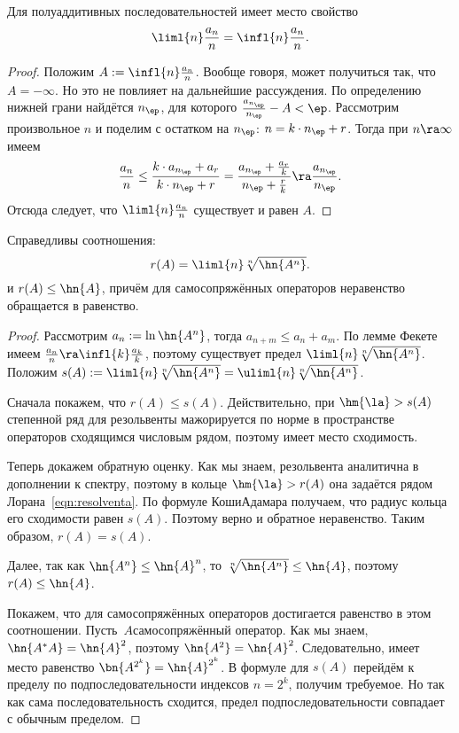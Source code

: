 \documentclass[a4paper]{article}
\begin{document}
\begin{lemma}[Фекете]
Для полуаддитивных последовательностей имеет место свойство
$$\liml{n} \frac{a_n}{n} = \infl{n}\frac{a_n}{n}.$$
\end{lemma}
\begin{proof}
Положим $A := \infl{n} \frac{a_n}{n}$. Вообще говоря, может получиться так, что $A = -\infty$.
Но это не повлияет на дальнейшие рассуждения. По определению нижней грани найдётся $n_\ep$,
для которого $\frac{a_{n_\ep}}{n_\ep}- A < \ep$. Рассмотрим произвольное $n$ и поделим с остатком на $n_\ep$:
$n = k\cdot n_\ep + r$. Тогда при $n \ra \infty$  имеем
$$\frac{a_n}{n} \le \frac{k\cdot a_{n_\ep} + a_r}{k\cdot n_\ep + r} = \frac{a_{n_\ep} + \frac{a_r}{k}}{n_\ep + \frac{r}{k}} \ra \frac{a_{n_\ep}}{n_\ep}.$$
Отсюда следует, что $\liml{n}\frac{a_n}{n}$ существует и равен $A$.
\end{proof}

\begin{lemma}
Справедливы соотношения:
$$r(A) = \liml{n} \sqrt[n]{\hn{A^n}}.$$
и $r(A) \le \hn{A}$, причём для самосопряжённых операторов неравенство обращается в равенство.
\end{lemma}
\begin{proof}
Рассмотрим $a_n := \ln \hn{A^n}$, тогда $a_{n+m} \le a_n + a_m$. По лемме Фекете
имеем $\frac{a_n}{n} \ra \infl{k} \frac{a_k}{k}$, поэтому существует предел
$\liml{n} \sqrt[n]{\hn{A^n}}$. Положим $s(A) := \liml{n}\sqrt[n]{\hn{A^n}} = \uliml{n}\sqrt[n]{\hn{A^n}}$.

Сначала покажем, что $r(A) \le s(A)$. Действительно, при $\hm{\la} > s(A)$ степенной ряд
для резольвенты
мажорируется по норме в пространстве операторов сходящимся числовым рядом, поэтому
имеет место сходимость.

Теперь докажем обратную оценку. Как мы знаем, резольвента аналитична в дополнении к спектру,
поэтому в кольце $\hm{\la} > r(A)$ она задаётся рядом Лорана~\eqref{eqn:resolventa}.
По формуле Коши\ч Адамара  получаем, что радиус кольца его сходимости равен $s(A)$.
Поэтому верно и обратное неравенство. Таким образом, $r(A) = s(A)$.

Далее, так как $\hn{A^n} \le \hn{A}^n$, то $\sqrt[n]{\hn{A^n}} \le \hn{A}$, поэтому $r(A) \le \hn{A}$.

Покажем, что для самосопряжённых операторов достигается равенство в этом соотношении.
Пусть~$A$\т самосопряжённый оператор. Как мы знаем, $\hn{A^*A} = \hn{A}^2$,
поэтому $\hn{A^2}=\hn{A}^2$. Следовательно, имеет место равенство $\bn{A^{2^k}} = \hn{A}^{2^k}$.
В формуле для $s(A)$ перейдём к пределу по подпоследовательности индексов $n = 2^k$, получим требуемое.
Но так как сама последовательность сходится, предел подпоследовательности совпадает с обычным пределом.
\end{proof}
\end{document}
